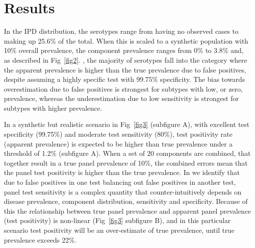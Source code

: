 \documentclass[10pt,letterpaper]{article}
\begin{document}
\section*{Results}

In the IPD distribution, the serotypes range from having no observed cases to making up 25.6\% of the total\cite{hyams2023a}. When this is scaled to a synthetic population with 10\% overall prevalence, the component prevalence ranges from 0\% to 3.8\% and, as described in Fig~\ref{fig2}. , the majority of serotypes fall into the category where the apparent prevalence is higher than the true prevalence due to false positives, despite assuming a highly specific test with 99.75\% specificity. The bias towards overestimation due to false positives is strongest for subtypes with low, or zero, prevalence, whereas the underestimation due to low sensitivity is strongest for subtypes with higher prevalence. 

In a synthetic but realistic scenario in Fig~\ref{fig3} (subfigure A), with excellent test specificity (99.75\%) and moderate test sensitivity (80\%), test positivity rate (apparent prevalence) is expected to be higher than true prevalence under a threshold of 1.2\% (subfigure A). When a set of 20 components are combined, that together result in a true panel prevalence of 10\%, the combined errors mean that the panel test positivity is higher than the true prevalence. In  we identify that due to false positives in one test balancing out false positives in another test, panel test sensitivity is a complex quantity that counter-intuitively depends on disease prevalence, component distribution, sensitivity and specificity. Because of this the relationship between true panel prevalence and apparent panel prevalence (test positivity) is non-linear (Fig~\ref{fig3} subfigure B), and in this particular scenario test positivity will be an over-estimate of true prevalence, until true prevalence exceeds 22\%.
\end{document}
